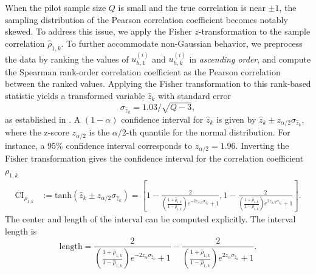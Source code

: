 When the pilot sample size $Q$ is small and the true correlation is near $\pm 1$, the sampling distribution of the Pearson correlation coefficient becomes notably skewed. To address this issue, we apply the Fisher $z$-transformation to the sample correlation $\widehat \rho_{1,k}$. To further accommodate non-Gaussian behavior, we preprocess the data by ranking the values of $u_{h,1}^{(i)}$ and ${u}_{h,k}^{(i)}$ in {\it ascending order}, and compute the Spearman rank-order correlation coefficient as the Pearson correlation between the ranked values. Applying the Fisher transformation to this rank-based statistic yields a transformed variable $\widehat z_k$ with standard error 
%
\begin{equation}\label{eq:SD_Fisher_Trans}
    \sigma_{\widehat z_k} = 1.03/\sqrt{Q - 3},
\end{equation}
%
as established in \cite{BiHi:2017, FiHaPe:1957}. A $(1 - \alpha)$ confidence interval for $\widehat z_k$ is given by $\widehat z_k \pm z_{\alpha/2}\sigma_{\widehat z_k}$, where the z-score $z_{\alpha/2}$ is the $\alpha/2$-th quantile for the normal distribution. For instance, a $95\%$ confidence interval corresponds to $z_{\alpha/2} = 1.96$. Inverting the Fisher transformation gives the confidence interval for the correlation coefficient $\rho_{1,k}$
%
\begin{align}
    \label{eq:Confidence_Interval_rho}
    \text{CI}_{\rho_{1,k}} &:= \text{tanh}\left(\widehat z_k \pm  z_{\alpha/2}\sigma_{\widehat z_k}\right)
    =\left[1-\frac{2}{\left(\frac{1+\widehat\rho_{1,k}}{1-\widehat\rho_{1,k}}\right)e^{-2z_{\alpha/2}\sigma_{\widehat z_k}}+1}, 1-\frac{2}{\left(\frac{1+\widehat\rho_{1,k}}{1-\widehat\rho_{1,k}}\right)e^{2z_{\alpha/2}\sigma_{\widehat z_k}}+1}\right].
\end{align}
%
The center and length of the interval can be computed explicitly. The interval length is
%
\[
\text{length} = \frac{2}{\left(\frac{1+\widehat\rho_{1,k}}{1-\widehat\rho_{1,k}}\right)e^{-2z_\alpha\sigma_{\widehat z_k}}+1}-\frac{2}{\left(\frac{1+\widehat\rho_{1,k}}{1-\widehat\rho_{1,k}}\right)e^{2z_\alpha\sigma_{\widehat z_k}}+1}.
\]
%

